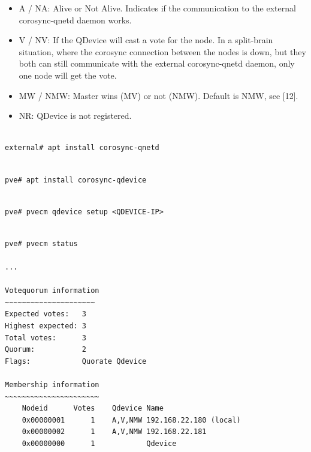 \begin{itemize}[leftmargin=2cm]

	\item A / NA: Alive or Not Alive. Indicates if the communication to the external corosync-qnetd daemon works.

	\item V / NV: If the QDevice will cast a vote for the node. In a split-brain situation, where the corosync connection between the nodes is down, but they both can still communicate with the external corosync-qnetd daemon, only one node will get the vote.

	\item MW / NMW: Master wins (MV) or not (NMW). Default is NMW, see [12].

	\item NR: QDevice is not registered.

\end{itemize}

\begin{lstlisting}

external# apt install corosync-qnetd

\end{lstlisting}

\begin{lstlisting}

pve# apt install corosync-qdevice

\end{lstlisting}

\begin{lstlisting}

pve# pvecm qdevice setup <QDEVICE-IP>

\end{lstlisting}

\begin{lstlisting}

pve# pvecm status

...

Votequorum information
~~~~~~~~~~~~~~~~~~~~~
Expected votes:   3
Highest expected: 3
Total votes:      3
Quorum:           2
Flags:            Quorate Qdevice

Membership information
~~~~~~~~~~~~~~~~~~~~~~
    Nodeid      Votes    Qdevice Name
    0x00000001      1    A,V,NMW 192.168.22.180 (local)
    0x00000002      1    A,V,NMW 192.168.22.181
    0x00000000      1            Qdevice

\end{lstlisting}

